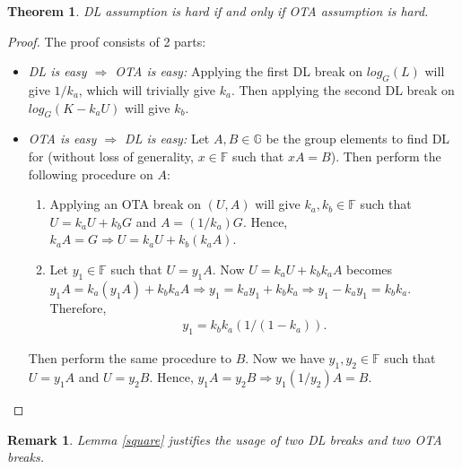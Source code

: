\documentclass{article}
\newtheorem{theorem}{Theorem}[section]
\newtheorem*{remark}{Remark}
\begin{document}
\begin{theorem}
DL assumption is hard if and only if OTA assumption is hard.
\end{theorem}
\begin{proof}
The proof consists of 2 parts:
    \begin{itemize}
    \item \textit{DL is easy $\Rightarrow$ OTA is easy:} Applying the first DL break on $log_G(L)$ will give $1/k_a$, which will trivially give $k_a$. Then applying the second DL break on $log_G(K - k_a U)$ will give $k_b$.
    \item \textit{OTA is easy $\Rightarrow$ DL is easy:} Let $A, B\in\mathbb{G}$ be the group elements to find DL for (without loss of generality, $x\in\mathbb{F}$ such that $xA=B$). Then perform the following procedure on $A$:
        \begin{enumerate}
        \item Applying an OTA break on $(U, A)$ will give $k_a, k_b\in\mathbb{F}$ such that $U = k_a U + k_b G$ and $A = (1/k_a)G$. Hence, $k_a A = G \Rightarrow U = k_a U + k_b (k_a A)$.
        \item Let $y_1\in\mathbb{F}$ such that $U=y_1 A$. Now $U = k_a U + k_b k_a A$ becomes $y_1 A = k_a (y_1 A) + k_b k_a A \Rightarrow y_1 = k_a y_1 + k_b k_a \Rightarrow y_1 - k_a y_1 = k_b k_a$. Therefore,
        \begin{align*}
            y_1 = k_b k_a (1/(1 - k_a)).
        \end{align*}
        \end{enumerate}
Then perform the same procedure to $B$. Now we have $y_1, y_2\in\mathbb{F}$ such that $U=y_1 A$ and $U=y_2 B$. Hence, $y_1 A = y_2 B \Rightarrow  y_1(1/y_2) A = B$.
    \end{itemize}
\end{proof}
\begin{remark}
Lemma \ref{square} justifies the usage of two DL breaks and two OTA breaks.
\end{remark}

%
%
\end{document}
